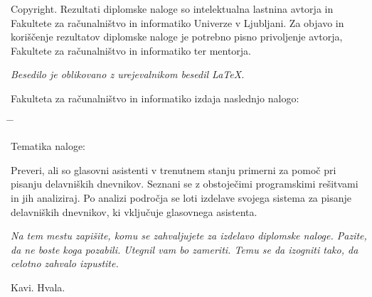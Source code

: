\documentclass[a4paper, 12pt]{book}
\newcommand{\clearemptydoublepage}{\newpage{\pagestyle{empty}\cleardoublepage}}
\begin{document}
\noindent
{\sc Copyright}. 
Rezultati diplomske naloge so intelektualna lastnina avtorja in Fakultete za računalništvo in informatiko Univerze v Ljubljani.
Za objavo in koriščenje rezultatov diplomske naloge je potrebno pisno privoljenje avtorja, Fakultete za računalništvo in informatiko ter mentorja.

\begin{center}
\mbox{}\vfill
\emph{Besedilo je oblikovano z urejevalnikom besedil \LaTeX.}
\end{center}
\clearemptydoublepage

\thispagestyle{empty}
\vspace*{4cm}

\noindent
Fakulteta za računalništvo in informatiko izdaja naslednjo nalogo:
\medskip
\begin{tabbing}
\hspace{32mm}\= \hspace{6cm} \= \kill




Tematika naloge:
\end{tabbing}
Preveri, ali so glasovni asistenti v trenutnem stanju primerni za pomoč pri pisanju delavniških dnevnikov.
Seznani se z obstoječimi programskimi rešitvami in jih analiziraj.
Po analizi področja se loti izdelave svojega sistema za pisanje delavniških dnevnikov, ki vključuje glasovnega asistenta.
\vspace{15mm}



\vspace{2cm}

\clearemptydoublepage

\thispagestyle{empty}\mbox{}\vfill\null\it%
\noindent
Na tem mestu zapišite, komu se zahvaljujete za izdelavo diplomske naloge. Pazite, da ne boste koga pozabili. Utegnil vam bo zameriti. Temu se da izogniti tako, da celotno zahvalo izpustite.
\rm\normalfont

\clearemptydoublepage

\thispagestyle{empty}\mbox{}{\textheight}\mbox{}\hfill\begin{minipage}{0.55\textwidth}%
	Kavi. Hvala.
\normalfont\end{minipage}
\end{document}
